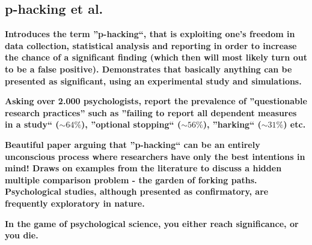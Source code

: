 \documentclass[12pt]{scrartcl}
\begin{document}
\subsection{p-hacking et al.}
\begin{description}
  \item {}
  
  \textbf{Introduces the term ''p-hacking``, that is exploiting one's freedom in data collection, statistical analysis and reporting in order to increase the chance of a significant finding (which then will most likely turn out to be a false positive). Demonstrates that basically anything can be presented as significant, using an experimental study and simulations.}
  
  \item {}
  
  \textbf{Asking over 2.000 psychologists, report the prevalence of ''questionable research practices'' such as ''failing to report all dependent measures in a study`` ($\sim 64\%$), ''optional stopping`` ($\sim 56\%$), ''harking`` ($\sim 31\%$) etc.}
  
  \item {}
  
  \textbf{Beautiful paper arguing that ''p-hacking`` can be an entirely unconscious process where researchers have only the best intentions in mind! Draws on examples from the literature to discuss a hidden multiple comparison problem - the garden of forking paths. Psychological studies, although presented as confirmatory, are frequently exploratory in nature.}
  
  \item {}
  
  \textbf{In the game of psychological science, you either reach significance, or you die.}
\end{description}
\end{document}
